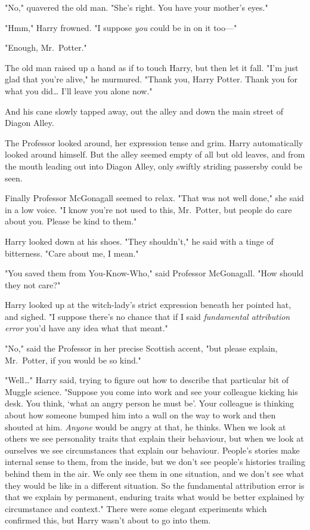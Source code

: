 "No," quavered the old man. "She's right. You have your mother's eyes."

"Hmm," Harry frowned. "I suppose \emph{you} could be in on it too---"

"Enough, Mr.~Potter."

The old man raised up a hand as if to touch Harry, but then let it fall. "I'm 
just glad that you're alive," he murmured. "Thank you, Harry Potter. Thank you 
for what you did{\ldots} I'll leave you alone now."

And his cane slowly tapped away, out the alley and down the main street of 
Diagon Alley.

The Professor looked around, her expression tense and grim. Harry automatically 
looked around himself. But the alley seemed empty of all but old leaves, and 
from the mouth leading out into Diagon Alley, only swiftly striding passersby 
could be seen.

Finally Professor McGonagall seemed to relax. "That was not well done," she 
said in a low voice. "I know you're not used to this, Mr.~Potter, but people do 
care about you. Please be kind to them."

Harry looked down at his shoes. "They shouldn't," he said with a tinge of 
bitterness. "Care about me, I mean."

"You saved them from You-Know-Who," said Professor McGonagall. "How should they 
not care?"

Harry looked up at the witch-lady's strict expression beneath her pointed hat, 
and sighed. "I suppose there's no chance that if I said \emph{fundamental 
attribution error} you'd have any idea what that meant."

"No," said the Professor in her precise Scottish accent, "but please explain, 
Mr.~Potter, if you would be so kind."

"Well{\ldots}" Harry said, trying to figure out how to describe that particular 
bit of Muggle science. "Suppose you come into work and see your colleague 
kicking his desk. You think, `what an angry person he must be'. Your colleague 
is thinking about how someone bumped him into a wall on the way to work and 
then shouted at him. \emph{Anyone} would be angry at that, he thinks. When we 
look at others we see personality traits that explain their behaviour, but when 
we look at ourselves we see circumstances that explain our behaviour. People's 
stories make internal sense to them, from the inside, but we don't see people's 
histories trailing behind them in the air. We only see them in one situation, 
and we don't see what they would be like in a different situation. So the 
fundamental attribution error is that we explain by permanent, enduring traits 
what would be better explained by circumstance and context." There were some 
elegant experiments which confirmed this, but Harry wasn't about to go into 
them.

